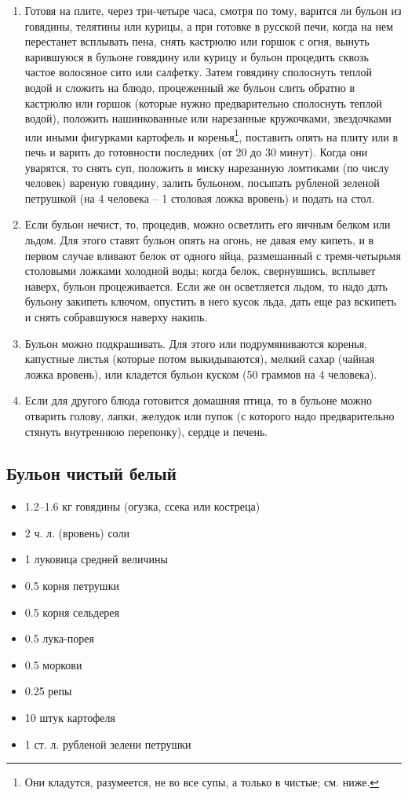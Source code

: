 \begin{enumerate}
	\item Готовя на плите, через три-четыре часа, смотря по тому, варится ли бульон из говядины, телятины или курицы, а при готовке в русской печи, когда на нем перестанет всплывать пена, снять кастрюлю или горшок с огня, вынуть варившуюся в бульоне говядину или курицу и бульон процедить сквозь частое волосяное сито или салфетку. Затем говядину сполоснуть теплой водой и сложить на блюдо, процеженный же бульон слить обратно в кастрюлю или горшок (которые нужно предварительно сполоснуть теплой водой), положить нашинкованные или нарезанные кружочками, звездочками или иными фигурками картофель и коренья\footnote{Они кладутся, разумеется, не во все супы, а только в чистые; см. ниже.}, поставить опять на плиту или в печь и варить до готовности последних (от 20 до 30 минут). Когда они уварятся, то снять суп, положить в миску нарезанную ломтиками (по числу человек) вареную говядину, залить бульоном, посыпать рубленой зеленой петрушкой (на 4 человека – 1 столовая ложка вровень) и подать на стол. 
	\item Если бульон нечист, то, процедив, можно осветлить его яичным белком или льдом. Для этого ставят бульон опять на огонь, не давая ему кипеть, и в первом случае вливают белок от одного яйца, размешанный с тремя-четырьмя столовыми ложками холодной воды; когда белок, свернувшись, всплывет наверх, бульон процеживается. Если же он осветляется льдом, то надо дать бульону закипеть ключом, опустить в него кусок льда, дать еще раз вскипеть и снять собравшуюся наверху накипь.
	\item Бульон можно подкрашивать. Для этого или подрумяниваются коренья, капустные листья (которые потом выкидываются), мелкий сахар (чайная ложка вровень), или кладется бульон куском (50 граммов на 4 человека).
	\item Если для другого блюда готовится домашняя птица, то в бульоне можно отварить голову, лапки, желудок или пупок (с которого надо предварительно стянуть внутреннюю перепонку), сердце и печень.
\end{enumerate}

\subsection{Бульон чистый белый}\label{1bul-bel}

\begin{itemize}
	\item 1.2–1.6 кг говядины (огузка, ссека или костреца) 
	\item 2 ч. л. (вровень) соли
    \item 1 луковица средней величины
    \item 0.5 корня петрушки
    \item 0.5 корня сельдерея
    \item 0.5 лука-порея
    \item 0.5 моркови
    \item 0.25 репы
    \item 10 штук картофеля
    \item 1 ст. л. рубленой зелени петрушки
\end{itemize}

